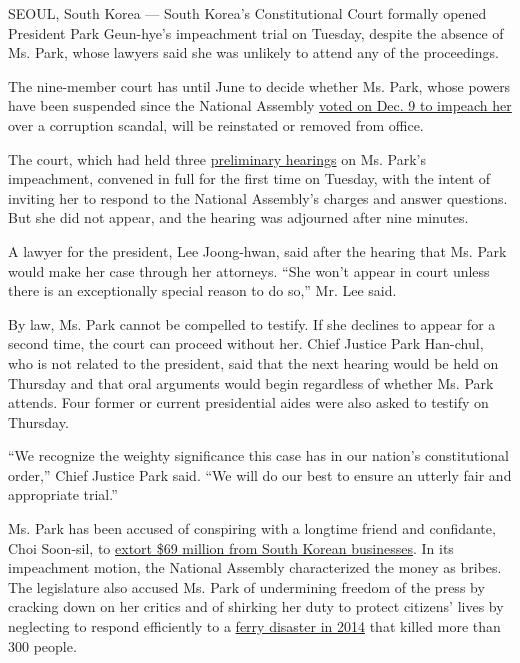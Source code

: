 SEOUL, South Korea --- South Korea's Constitutional Court formally
opened President Park Geun-hye's impeachment trial on Tuesday, despite
the absence of Ms. Park, whose lawyers said she was unlikely to attend
any of the proceedings.

The nine-member court has until June to decide whether Ms. Park, whose
powers have been suspended since the National Assembly
\href{http://www.nytimes.com/2016/12/09/world/asia/south-korea-president-park-geun-hye-impeached.html}{voted
on Dec. 9 to impeach her} over a corruption scandal, will be reinstated
or removed from office.

The court, which had held three
\href{http://www.nytimes.com/2016/12/22/world/asia/south-korea-president-park-impeachment.html}{preliminary
hearings} on Ms. Park's impeachment, convened in full for the first time
on Tuesday, with the intent of inviting her to respond to the National
Assembly's charges and answer questions. But she did not appear, and the
hearing was adjourned after nine minutes.

A lawyer for the president, Lee Joong-hwan, said after the hearing that
Ms. Park would make her case through her attorneys. ``She won't appear
in court unless there is an exceptionally special reason to do so,'' Mr.
Lee said.

By law, Ms. Park cannot be compelled to testify. If she declines to
appear for a second time, the court can proceed without her. Chief
Justice Park Han-chul, who is not related to the president, said that
the next hearing would be held on Thursday and that oral arguments would
begin regardless of whether Ms. Park attends. Four former or current
presidential aides were also asked to testify on Thursday.

``We recognize the weighty significance this case has in our nation's
constitutional order,'' Chief Justice Park said. ``We will do our best
to ensure an utterly fair and appropriate trial.''

Ms. Park has been accused of conspiring with a longtime friend and
confidante, Choi Soon-sil, to
\href{http://www.nytimes.com/2017/01/02/world/asia/south-korea-park-geun-hye-samsung.html}{extort
\$69 million from South Korean businesses}. In its impeachment motion,
the National Assembly characterized the money as bribes. The legislature
also accused Ms. Park of undermining freedom of the press by cracking
down on her critics and of shirking her duty to protect citizens' lives
by neglecting to respond efficiently to a
\href{http://www.nytimes.com/interactive/2015/04/12/world/asia/12ferry-timeline.html}{ferry
disaster in 2014} that killed more than 300 people.

